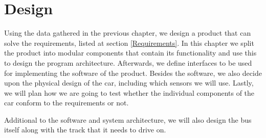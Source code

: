 \chapter{Design}

Using the data gathered in the previous chapter, we design a product that can solve the requirements, listed at section \ref{Requirements}. In this chapter we split the product into modular components that contain its functionality and use this to design the program architecture. Afterwards, we define interfaces to be used for implementing the software of the product. Besides the software, we also decide upon the physical design of the car, including which sensors we will use. Lastly, we will plan how we are going to test whether the individual components of the car conform to the requirements or not.






Additional to the software and system architecture, we will also design the bus itself along with the track that it needs to drive on. 


